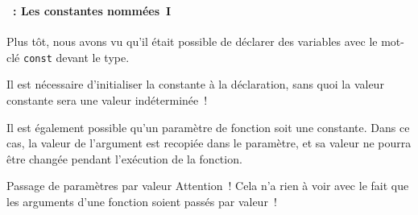 \begin{frame}[containsverbatim]
  \frametitle{\secname}
  \framesubtitle{\subsecname~: Les constantes nommées~I} 

  Plus tôt, nous avons vu qu'il était possible de déclarer des variables avec le mot-clé \verb|const| devant le type.
  \vspace{0.5cm}
  \par
  Il est nécessaire d'initialiser la constante à la déclaration, sans quoi la valeur constante sera une valeur indéterminée~!
  \vspace{0.5cm}
  \par
  Il est également possible qu'un paramètre de fonction soit une constante. Dans ce cas, la valeur de l'argument est recopiée dans le paramètre, 
  et sa valeur ne pourra être changée pendant l'exécution de la fonction.
  \begin{alertblock}{Passage de paramètres par valeur}
     Attention~! Cela n'a rien à voir avec le fait que les arguments d'une fonction soient passés par valeur~!
  \end{alertblock}

\end{frame}

